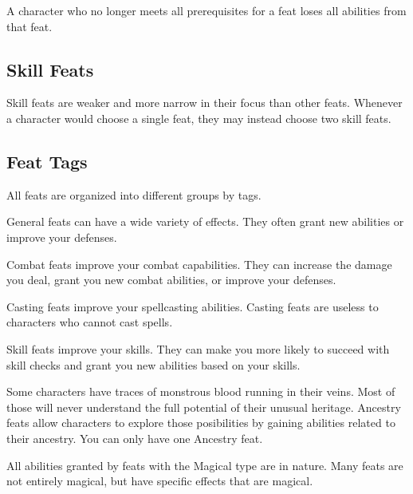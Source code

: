     A character who no longer meets all prerequisites for a feat loses all abilities from that feat.

  \subsection{Skill Feats}
    Skill feats are weaker and more narrow in their focus than other feats.
    Whenever a character would choose a single feat, they may instead choose two skill feats.

  \subsection{Feat Tags}
    All feats are organized into different groups by tags.

     General feats can have a wide variety of effects.
    They often grant new abilities or improve your defenses.

     Combat feats improve your combat capabilities.
    They can increase the damage you deal, grant you new combat abilities, or improve your defenses.

     Casting feats improve your spellcasting abilities.
    Casting feats are useless to characters who cannot cast spells.

     Skill feats improve your skills.
    They can make you more likely to succeed with skill checks and grant you new abilities based on your skills.

     Some characters have traces of monstrous blood running in their veins.
    Most of those will never understand the full potential of their unusual heritage.
    Ancestry feats allow characters to explore those posibilities by gaining abilities related to their ancestry.
    You can only have one Ancestry feat.

    All abilities granted by feats with the Magical type are \magical in nature.
    Many feats are not entirely magical, but have specific effects that are magical.

